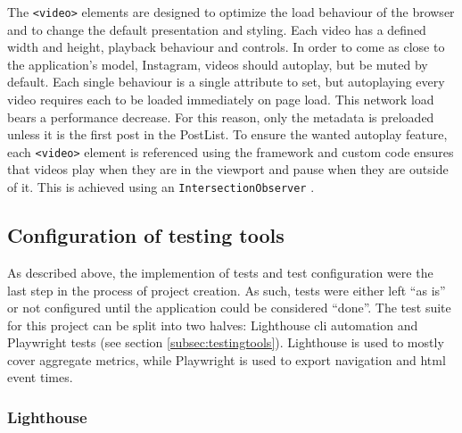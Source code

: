 \documentclass[a4paper, 12pt]{article}
\begin{document}
The \verb|<video>| elements are designed to optimize the load behaviour of the browser and to change the default presentation and styling.
Each video has a defined width and height, playback behaviour and controls.
In order to come as close to the application's model, Instagram, videos should autoplay, but be muted by default.
Each single behaviour is a single attribute to set, but autoplaying every video requires each to be loaded immediately on page load.
This network load bears a performance decrease.
For this reason, only the metadata is preloaded unless it is the first post in the PostList.
To ensure the wanted autoplay feature, each \verb|<video>| element is referenced using the framework and custom code ensures that videos play when they are in the viewport and pause when they are outside of it.
This is achieved using an \verb|IntersectionObserver| \citep{IntersectionObserver}.

\subsection{Configuration of testing tools}\label{subsec:tests}
% 

As described above, the implemention of tests and test configuration were the last step in the process of project creation.
As such, tests were either left \enquote{as is} or not configured until the application could be considered \enquote{done}.
The test suite for this project can be split into two halves: Lighthouse \acrshort{cli} automation and Playwright tests (see section \ref{subsec:testingtools}).
Lighthouse is used to mostly cover aggregate metrics, while Playwright is used to export navigation and \acrshort{html} event times.

\subsubsection{Lighthouse}
\end{document}
